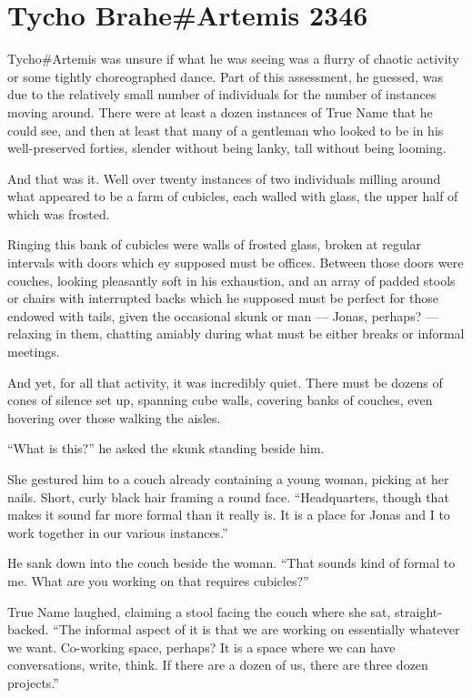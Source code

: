\hypertarget{tycho-braheartemis-2346}{%
\chapter{Tycho Brahe\#Artemis 2346}\label{tycho-braheartemis-2346}}

Tycho\#Artemis was unsure if what he was seeing was a flurry of chaotic activity or some tightly choreographed dance. Part of this assessment, he guessed, was due to the relatively small number of individuals for the number of instances moving around. There were at least a dozen instances of True Name that he could see, and then at least that many of a gentleman who looked to be in his well-preserved forties, slender without being lanky, tall without being looming.

And that was it. Well over twenty instances of two individuals milling around what appeared to be a farm of cubicles, each walled with glass, the upper half of which was frosted.

Ringing this bank of cubicles were walls of frosted glass, broken at regular intervals with doors which ey supposed must be offices. Between those doors were couches, looking pleasantly soft in his exhaustion, and an array of padded stools or chairs with interrupted backs which he supposed must be perfect for those endowed with tails, given the occasional skunk or man — Jonas, perhaps? — relaxing in them, chatting amiably during what must be either breaks or informal meetings.

And yet, for all that activity, it was incredibly quiet. There must be dozens of cones of silence set up, spanning cube walls, covering banks of couches, even hovering over those walking the aisles.

``What is this?'' he asked the skunk standing beside him.

She gestured him to a couch already containing a young woman, picking at her nails. Short, curly black hair framing a round face. ``Headquarters, though that makes it sound far more formal than it really is. It is a place for Jonas and I to work together in our various instances.''

He sank down into the couch beside the woman. ``That sounds kind of formal to me. What are you working on that requires cubicles?''

True Name laughed, claiming a stool facing the couch where she sat, straight-backed. ``The informal aspect of it is that we are working on essentially whatever we want. Co-working space, perhaps? It is a space where we can have conversations, write, think. If there are a dozen of us, there are three dozen projects.''


